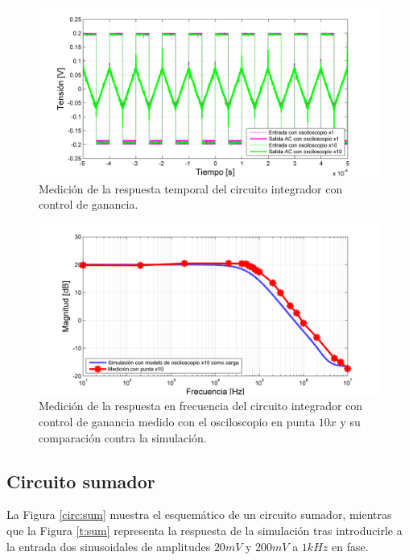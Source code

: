 \begin{figure}[H]
  \centering
\includegraphics[width=1.1\textwidth]{gfx_22/INT2_M}
  \caption{Medición de la respuesta temporal del circuito integrador con control de ganancia.}
  \label{m:int2}
\end{figure}


\begin{figure}[H]
  \centering
\includegraphics[width=1.1\textwidth]{gfx_22/INT2_MF}
  \caption{Medición de la respuesta en frecuencia del circuito integrador con control de ganancia medido con el osciloscopio en punta $10x$ y su comparación contra la simulación.}
  \label{mf:int2}
\end{figure}



\subsection{Circuito sumador}

La Figura \ref{circ:sum} muestra el esquemático de un circuito sumador, mientras que la Figura \ref{t:sum} representa la respuesta de la simulación tras introducirle a la entrada dos sinusoidales de amplitudes $20mV$ y $200mV$ a $1kHz$ en fase.


